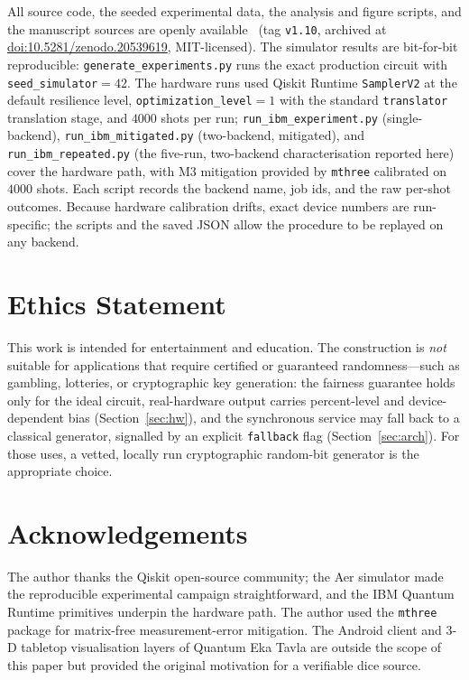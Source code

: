 \documentclass{ieeeaccess}
\begin{document}
All source code, the seeded experimental data, the analysis and figure scripts, and the manuscript sources are openly available~\cite{projectrepo} (tag \texttt{v1.10}, archived at \href{https://doi.org/10.5281/zenodo.20539619}{doi:10.5281/zenodo.20539619}, MIT-licensed). The simulator results are bit-for-bit reproducible: \texttt{generate\_experiments.py} runs the exact production circuit with \texttt{seed\_simulator}$=42$. The hardware runs used Qiskit Runtime \texttt{SamplerV2} at the default resilience level, \texttt{optimization\_level}$=1$ with the standard \texttt{translator} translation stage, and $4000$ shots per run; \texttt{run\_ibm\_experiment.py} (single-backend), \texttt{run\_ibm\_mitigated.py} (two-backend, mitigated), and \texttt{run\_ibm\_repeated.py} (the five-run, two-backend characterisation reported here) cover the hardware path, with M3 mitigation provided by \texttt{mthree} calibrated on $4000$ shots. Each script records the backend name, job ids, and the raw per-shot outcomes. Because hardware calibration drifts, exact device numbers are run-specific; the scripts and the saved JSON allow the procedure to be replayed on any backend.

\section*{Ethics Statement}

This work is intended for entertainment and education. The construction is \emph{not} suitable for applications that require certified or guaranteed randomness---such as gambling, lotteries, or cryptographic key generation: the fairness guarantee holds only for the ideal circuit, real-hardware output carries percent-level and device-dependent bias (Section~\ref{sec:hw}), and the synchronous service may fall back to a classical generator, signalled by an explicit \texttt{fallback} flag (Section~\ref{sec:arch}). For those uses, a vetted, locally run cryptographic random-bit generator is the appropriate choice.

\section*{Acknowledgements}

The author thanks the Qiskit open-source community; the Aer simulator made the reproducible experimental campaign straightforward, and the IBM Quantum Runtime primitives underpin the hardware path. The author used the \texttt{mthree} package for matrix-free measurement-error mitigation. The Android client and 3-D tabletop visualisation layers of Quantum Eka Tavla are outside the scope of this paper but provided the original motivation for a verifiable dice source.




\EOD
\end{document}
